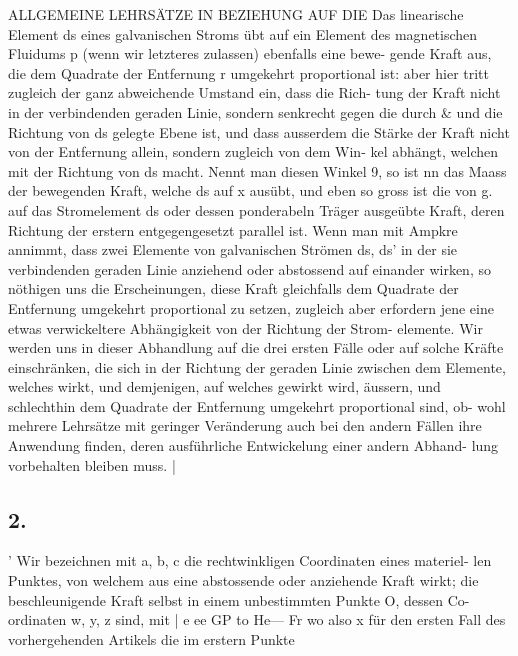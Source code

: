 \documentclass[12pt,a4paper]{article}
\begin{document}
ALLGEMEINE LEHRSÄTZE IN BEZIEHUNG AUF DIE Das linearische Element ds eines galvanischen Stroms übt auf ein Element des magnetischen Fluidums p (wenn wir letzteres zulassen) ebenfalls eine bewe- gende Kraft aus, die dem Quadrate der Entfernung r umgekehrt proportional ist: aber hier tritt zugleich der ganz abweichende Umstand ein, dass die Rich- tung der Kraft nicht in der verbindenden geraden Linie, sondern senkrecht gegen die durch \& und die Richtung von ds gelegte Ebene ist, und dass ausserdem die Stärke der Kraft nicht von der Entfernung allein, sondern zugleich von dem Win- kel abhängt, welchen \guillemotright{} mit der Richtung von ds macht. Nennt man diesen Winkel 9, so ist nn das Maass der bewegenden Kraft, welche ds auf x ausübt, und eben so gross ist die von g. auf das Stromelement ds oder dessen ponderabeln Träger ausgeübte Kraft, deren Richtung der erstern entgegengesetzt parallel ist. Wenn man mit Ampkre annimmt, dass zwei Elemente von galvanischen Strömen ds, ds' in der sie verbindenden geraden Linie anziehend oder abstossend auf einander wirken, so nöthigen uns die Erscheinungen, diese Kraft gleichfalls dem Quadrate der Entfernung umgekehrt proportional zu setzen, zugleich aber erfordern jene eine etwas verwickeltere Abhängigkeit von der Richtung der Strom- elemente. Wir werden uns in dieser Abhandlung auf die drei ersten Fälle oder auf solche Kräfte einschränken, die sich in der Richtung der geraden Linie zwischen dem Elemente, welches wirkt, und demjenigen, auf welches gewirkt wird, äussern, und schlechthin dem Quadrate der Entfernung umgekehrt proportional sind, ob- wohl mehrere Lehrsätze mit geringer Veränderung auch bei den andern Fällen ihre Anwendung finden, deren ausführliche Entwickelung einer andern Abhand- lung vorbehalten bleiben muss. |

\subsection*{2.}
' Wir bezeichnen mit a, b, c die rechtwinkligen Coordinaten eines materiel- len Punktes, von welchem aus eine abstossende oder anziehende Kraft wirkt; die beschleunigende Kraft selbst in einem unbestimmten Punkte O, dessen Co- ordinaten w, y, z sind, mit | e ee GP to He--- Fr wo also x für den ersten Fall des vorhergehenden Artikels die im erstern Punkte


\newpage
\end{document}
